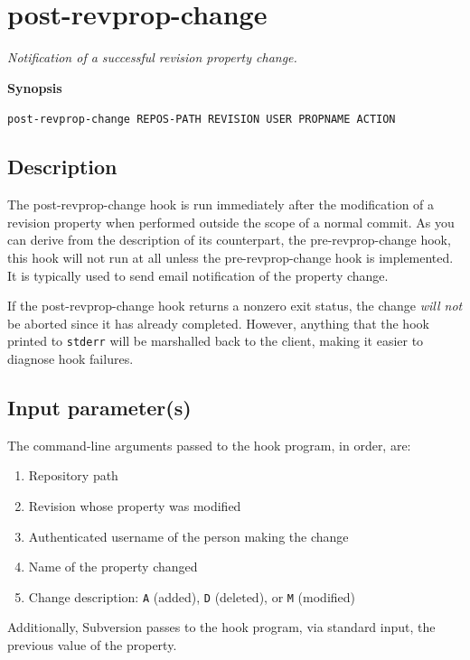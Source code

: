 \section{post-revprop-change}\label{svn.ref.reposhooks.post-revprop-change}

\emph{Notification of a successful revision property change.}

\textbf{Synopsis}

\texttt{post-revprop-change\ REPOS-PATH\ REVISION\ USER\ PROPNAME\ ACTION}

\subsection{Description}

The post-revprop-change hook is run immediately after the modification
of a revision property when performed outside the scope of a normal
commit. As you can derive from the description of its counterpart, the
pre-revprop-change hook, this hook will not run at all unless the
pre-revprop-change hook is implemented. It is typically used to send
email notification of the property change.

If the post-revprop-change hook returns a nonzero exit status, the
change \emph{will not} be aborted since it has already completed.
However, anything that the hook printed to \texttt{stderr} will be
marshalled back to the client, making it easier to diagnose hook
failures.

\subsection{Input parameter(s)}

The command-line arguments passed to the hook program, in order, are:

\begin{enumerate}
\def\labelenumi{\arabic{enumi}.}
\item
  Repository path
\item
  Revision whose property was modified
\item
  Authenticated username of the person making the change
\item
  Name of the property changed
\item
  Change description: \texttt{A} (added), \texttt{D} (deleted), or
  \texttt{M} (modified)
\end{enumerate}

Additionally, Subversion passes to the hook program, via standard input,
the previous value of the property.

